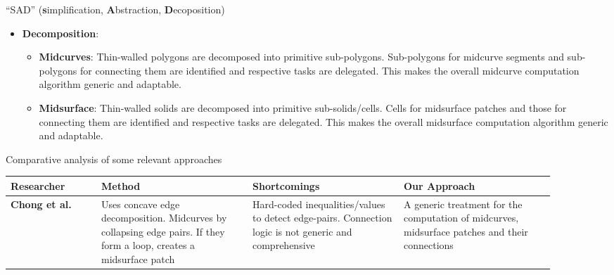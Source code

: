 \begin{frame}{``SAD'' (\textbf{s}implification, \textbf{A}bstraction, \textbf{D}ecoposition)}
\begin{itemize}
\item \textbf{Decomposition}: 
	\begin{itemize}
	\item \textbf{Midcurves}: Thin-walled polygons are decomposed into primitive sub-polygons. Sub-polygons for midcurve segments and sub-polygons for connecting them are identified and respective tasks are delegated. This makes the overall midcurve computation algorithm generic and adaptable.
	\item \textbf{Midsurface}: Thin-walled solids are decomposed into primitive sub-solids/cells. Cells for midsurface patches and those for connecting them are identified and respective tasks are delegated. This makes the overall midsurface computation algorithm generic and adaptable.
	\end{itemize}
\end{itemize}
\end{frame}



\begin{frame}{Comparative analysis of some relevant approaches}
\begin{table}[!htb]
  \centering 
\begin{tabular}[htp]{@{} p{0.15\linewidth} p{0.25\linewidth}  p{0.25\linewidth} p{0.25\linewidth} @{}}
\toprule
\textbf{Researcher}  &	\textbf{Method} &	 \textbf{Shortcomings}  &	 \textbf{Our Approach}\\ \midrule
\textbf{Chong et al.} \cite{Chong2004}  & 
Uses concave edge decomposition. Midcurves by collapsing edge pairs. If they form a loop, creates a midsurface patch & 
Hard-coded inequalities/values to detect edge-pairs. Connection logic is not generic and comprehensive &
A generic treatment for the computation of midcurves, midsurface patches and their connections
\\ \midrule
\end{tabular}
\end{table}
\end{frame}



